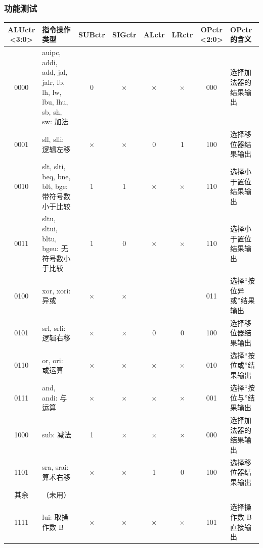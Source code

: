 \documentclass[UTF8,a4paper,11pt]{ctexart}
\newcommand{\placeholder}[1]{
\begin{tcolorbox}[colback=sub,colframe=main,boxrule=0.6pt,arc=2mm,left=2mm,right=2mm,top=1mm,bottom=1mm]
#1
\end{tcolorbox}
}
\begin{document}
\subsubsection{功能测试}
\placeholder{
    \begin{center}
    \renewcommand{\arraystretch}{1.3}
    \setlength{\tabcolsep}{3pt}
    \scriptsize
    \begin{tabularx}{\linewidth}{|c|>{\raggedright\arraybackslash\hsize=1.4\hsize}X|c|c|c|c|c|>{\raggedright\arraybackslash\hsize=0.6\hsize}X|}
    \hline
    \shortstack{ALUctr\\<3:0>} & 指令操作类型 & SUBctr & SIGctr & ALctr & LRctr & \shortstack{OPctr\\<2:0>} & OPctr 的含义 \\
    \hline
    0000 & auipc, addi, add, jal, jalr, lb, lh, lw, lbu, lhu, sb, sh, sw: 加法 & 0 & $\times$ & $\times$ & $\times$ & 000 & 选择加法器的结果输出 \\
    \hline
    0001 & sll, slli: 逻辑左移 & $\times$ & $\times$ & 0 & 1 & 100 & 选择移位器结果输出 \\
    \hline
    0010 & slt, slti, beq, bne, blt, bge: 带符号数小于比较 & 1 & 1 & $\times$ & $\times$ & 110 & 选择小于置位结果输出 \\
    \hline
    0011 & sltu, sltui, bltu, bgeu: 无符号数小于比较 & 1 & 0 & $\times$ & $\times$ & 110 & 选择小于置位结果输出 \\
    \hline
    0100 & xor, xori: 异或 & $\times$ & $\times$ & & & 011 & 选择“按位异或”结果输出 \\
    \hline
    0101 & srl, srli: 逻辑右移 & $\times$ & $\times$ & 0 & 0 & 100 & 选择移位器结果输出 \\
    \hline
    0110 & or, ori: 或运算 & $\times$ & $\times$ & $\times$ & $\times$ & 010 & 选择“按位或”结果输出 \\
    \hline
    0111 & and, andi: 与运算 & $\times$ & $\times$ & $\times$ & $\times$ & 001 & 选择“按位与”结果输出 \\
    \hline
    1000 & sub: 减法 & 1 & $\times$ & $\times$ & $\times$ & 000 & 选择加法器的结果输出 \\
    \hline
    1101 & sra, srai: 算术右移 & $\times$ & $\times$ & 1 & 0 & 100 & 选择移位器结果输出 \\
    \hline
    其余 & （未用） & & & & & & \\
    \hline
    1111 & lui: 取操作数 B & $\times$ & $\times$ & $\times$ & $\times$ & 101 & 选择操作数 B直接输出 \\
    \hline
    \end{tabularx}
    \end{center}
}
\end{document}
